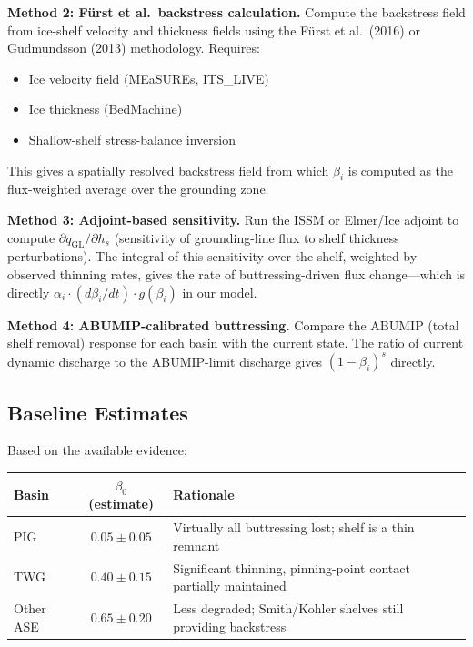 \documentclass[11pt]{article}
\theoremstyle{definition}
\begin{document}
\textbf{Method 2: F\"{u}rst et al.\ backstress calculation.}  Compute the backstress field from ice-shelf velocity and thickness fields using the F\"{u}rst et al.\ (2016) or Gudmundsson (2013) methodology.  Requires:
\begin{itemize}
  \item Ice velocity field (MEaSUREs, ITS\_LIVE)
  \item Ice thickness (BedMachine)
  \item Shallow-shelf stress-balance inversion
\end{itemize}
This gives a spatially resolved backstress field from which $\beta_i$ is computed as the flux-weighted average over the grounding zone.

\textbf{Method 3: Adjoint-based sensitivity.}  Run the ISSM or Elmer/Ice adjoint to compute $\partial q_\text{GL} / \partial h_s$ (sensitivity of grounding-line flux to shelf thickness perturbations).  The integral of this sensitivity over the shelf, weighted by observed thinning rates, gives the rate of buttressing-driven flux change---which is directly $\alpha_i \cdot (d\beta_i/dt) \cdot g(\beta_i)$ in our model.

\textbf{Method 4: ABUMIP-calibrated buttressing.}  Compare the ABUMIP (total shelf removal) response for each basin with the current state.  The ratio of current dynamic discharge to the ABUMIP-limit discharge gives $(1 - \beta_i)^s$ directly.

\subsection{Baseline Estimates}

Based on the available evidence:

\begin{center}
\begin{tabular}{lcl}
  \toprule
  \textbf{Basin} & $\beta_0$ (estimate) & \textbf{Rationale} \\
  \midrule
  PIG & $0.05 \pm 0.05$ & Virtually all buttressing lost; shelf is a thin remnant \\
  TWG & $0.40 \pm 0.15$ & Significant thinning, pinning-point contact partially maintained \\
  Other ASE & $0.65 \pm 0.20$ & Less degraded; Smith/Kohler shelves still providing backstress \\
  \bottomrule
\end{tabular}
\end{center}
\end{document}
